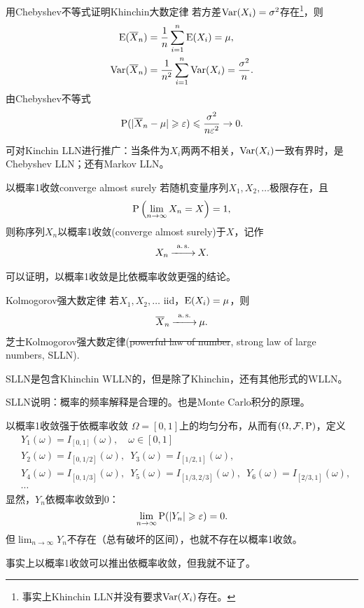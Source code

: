\begin{example}{用Chebyshev不等式证明Khinchin大数定律}{}
	若方差$\Var(X_i)=\sigma^2$存在\footnote{事实上Khinchin LLN并没有要求$\Var(X_i)$存在。}，则
	\begin{align}
		\E(\avg X_n)&=\frac1n\sum_{i=1}^n\E(X_i)=\mu,\\
		\Var(\avg X_n)&=\frac1{n^2}\sum_{i=1}^n\Var(X_i)=\frac{\sigma^2}n.
	\end{align}
	由Chebyshev不等式
	\[
		\P(|\avg X_n-\mu|\geqslant\varepsilon)\leqslant\frac{\sigma^2}{n\varepsilon^2}\to 0.
	\]
\end{example}

可对Kinchin LLN进行推广：当条件为$X_i$两两不相关，$\Var(X_i)$一致有界时，是Chebyshev LLN；还有Markov LLN。
\begin{definition}{以概率1收敛}{converge almost surely}
	若随机变量序列$X_1,X_2,\ldots$极限存在，且
	\begin{align}
		\P\kh{\lim_{n\to\infty}X_n=X}=1,
	\end{align}
	则称序列$X_n$以概率1收敛(converge almost surely)于$X$，记作
	\begin{align}
		X_n\asto X.
	\end{align}
\end{definition}
可以证明，以概率1收敛是比依概率收敛更强的结论。
\begin{theorem}{Kolmogorov强大数定律}{}
	若$X_1,X_2,\ldots$ iid，$\E(X_i)=\mu$，则 
	\begin{align}
		\avg X_n\asto\mu.
	\end{align}
	芝士Kolmogorov强大数定律(\sout{powerful law of number}, strong law of large numbers, SLLN).
\end{theorem}
SLLN是包含Khinchin WLLN的，但是除了Khinchin，还有其他形式的WLLN。

SLLN说明：概率的频率解释是合理的。也是Monte Carlo积分的原理。

\begin{example}{以概率1收敛强于依概率收敛}{}
	$\Omega=[0,1]$上的均匀分布，从而有$(\Omega,\cF,\P)$，定义
	\begin{align*}
		&Y_1(\omega)=I_{[0,1]}(\omega),\quad\omega\in[0,1]\\
		&Y_2(\omega)=I_{[0,1/2]}(\omega),\enspace Y_3(\omega)=I_{[1/2,1]}(\omega),\\
		&Y_4(\omega)=I_{[0,1/3]}(\omega),\enspace Y_5(\omega)=I_{[1/3,2/3]}(\omega),\enspace Y_6(\omega)=I_{[2/3,1]}(\omega),\\
		&\cdots
	\end{align*}
	显然，$Y_n$依概率收敛到0：
	\[
		\lim_{n\to\infty}\P(|Y_n|\geqslant\varepsilon)=0.
	\]
	但$\lim_{n\to\infty}Y_n$不存在（总有破坏的区间），也就不存在以概率1收敛。
\end{example}
事实上以概率1收敛可以推出依概率收敛，但我就不证了。

